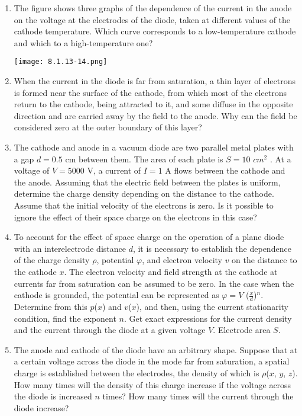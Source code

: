 \documentclass{article}
\begin{document}
\begin{enumerate}[label=8.1.\arabic*]
\item The figure shows three graphs of the dependence of the current in the anode on the voltage at the electrodes of the diode, taken at different values of the cathode temperature. Which curve corresponds to a low-temperature cathode and which to a high-temperature one?

\begin{center}
    \texttt{[image: 8.1.13-14.png]}
\end{center}


\item When the current in the diode is far from saturation, a thin layer of electrons is formed near the surface of the cathode, from which most of the electrons return to the cathode, being attracted to it, and some diffuse in the opposite direction and are carried away by the field to the anode. Why can the field be considered zero at the outer boundary of this layer?

\item The cathode and anode in a vacuum diode are two parallel metal plates with a gap $d = 0.5$ cm between them. The area of each plate is $S = 10$ $cm^2$ . At a voltage of $V = 5000$ V, a current of $I = 1$ A flows between the cathode and the anode. Assuming that the electric field between the plates is uniform, determine the charge density depending on the distance to the cathode. Assume that the initial velocity of the electrons is zero. Is it possible to ignore the effect of their space charge on the electrons in this case?

\item To account for the effect of space charge on the operation of a plane diode with an interelectrode distance $d$, it is necessary to establish the dependence of the charge density $\rho$, potential $\varphi$, and electron velocity $v$ on the distance to the cathode $x$. The electron velocity and field strength at the cathode at currents far from saturation can be assumed to be zero. In the case when the cathode is grounded, the potential can be represented as $\varphi = V$ ($\frac{x}{d}$)$^n$. Determine from this $p$($x$) and $v$($x$), and then, using the current stationarity condition, find the exponent $n$. Get exact expressions for the current density and the current through the diode at a given voltage $V$. Electrode area $S$.

\item The anode and cathode of the diode have an arbitrary shape. Suppose that at a certain voltage across the diode in the mode far from saturation, a spatial charge is established between the electrodes, the density of which is $\rho$($x$, $y$, $z$). How many times will the density of this charge increase if the voltage across the diode is increased $n$ times? How many times will the current through the diode increase?


\end{enumerate}
\end{document}
